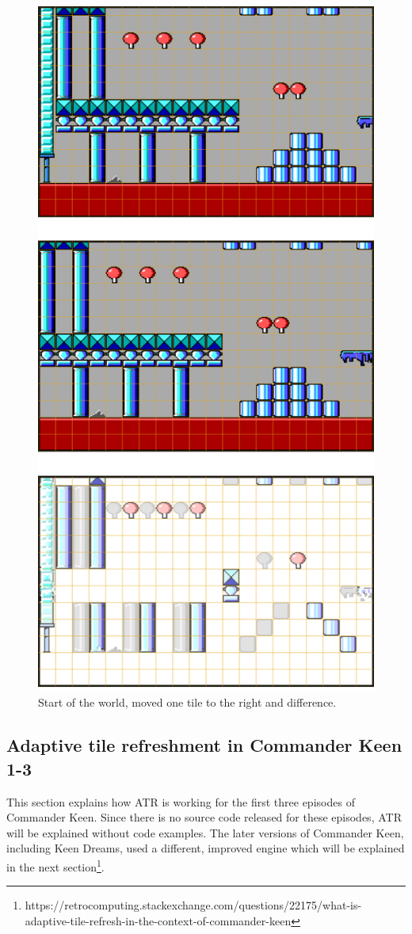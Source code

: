 \documentclass[book.tex]{subfiles}
\begin{document}
\pagebreak
\begin{figure}[H] 
  \centering 
  \includegraphics[width=.66\textwidth]{screenshots_300dpi/game/keen-ATR-diff.png}
  \caption{Start of the world, moved one tile to the right and difference.}
  \label{fig:keen_difference}
\end{figure}
\pagebreak

\subsection{Adaptive tile refreshment in Commander Keen 1-3}
This section explains how ATR is working for the first three episodes of Commander Keen. Since there is no source code released for these episodes, ATR will be explained without code examples. The later versions of Commander Keen, including Keen Dreams, used a different, improved engine which will be explained in the next section\footnote{https://retrocomputing.stackexchange.com/questions/22175/what-is-adaptive-tile-refresh-in-the-context-of-commander-keen}.\\
\end{document}

